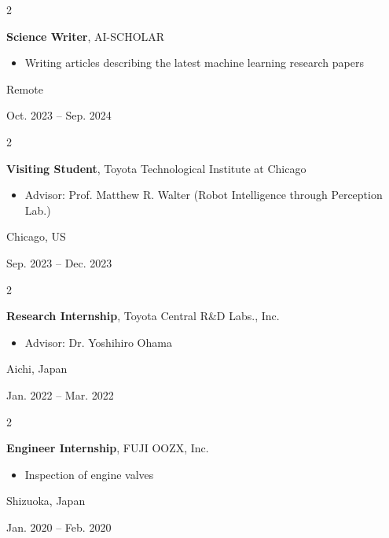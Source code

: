 \documentclass[10pt, letterpaper]{article}
\newenvironment{highlights}{
    \begin{itemize}[
        topsep=0.10 cm,
        parsep=0.10 cm,
        partopsep=0pt,
        itemsep=0pt,
        leftmargin=0.4 cm + 10pt
    ]
}{
    \end{itemize}
} %
\newenvironment{twocolentry}[2][]{
    \onecolentry
    \def\secondColumn{#2}
    \setcolumnwidth{\fill, 4.5 cm}
    \begin{paracol}{2}
}{
    \switchcolumn \raggedleft \secondColumn
    \end{paracol}
    \endonecolentry
} %
\begin{document}
        \vspace{0.2 cm}

        \begin{twocolentry}{
            Remote

        Oct. 2023 --  Sep. 2024
        }
            \textbf{Science Writer}, AI-SCHOLAR
            \begin{highlights}
                \item Writing articles describing the latest machine learning research papers
            \end{highlights}
        \end{twocolentry}

        \vspace{0.2 cm}

        \begin{twocolentry}{
            Chicago, US

            Sep. 2023 -- Dec. 2023
        }
            \textbf{Visiting Student}, Toyota Technological Institute at Chicago
            \begin{highlights}
                \item Advisor: Prof. Matthew R. Walter (Robot Intelligence through Perception Lab.)
            \end{highlights}
        \end{twocolentry}

        \vspace{0.2 cm}

        \begin{twocolentry}{
            Aichi, Japan

            Jan. 2022 -- Mar. 2022
        }
            \textbf{Research Internship}, Toyota Central R\&D Labs., Inc.
            \begin{highlights}
                \item Advisor: Dr. Yoshihiro Ohama
            \end{highlights}
        \end{twocolentry}

        \vspace{0.2 cm}

        \begin{twocolentry}{
            Shizuoka, Japan

            Jan. 2020 -- Feb. 2020
        }
            \textbf{Engineer Internship}, FUJI OOZX, Inc.
            \begin{highlights}
                \item Inspection of engine valves
            \end{highlights}
        \end{twocolentry}
\end{document}
